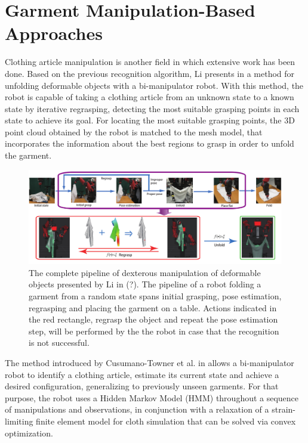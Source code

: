 \section{Garment Manipulation-Based Approaches}
\label{sota:garment_manipulation_based}
Clothing article manipulation is another field in which extensive work has been done. Based on the previous recognition algorithm, Li presents in \cite{Li2015ICRA} a method for unfolding deformable objects with a bi-manipulator robot. With this method, the robot is capable of taking a clothing article from an unknown state to a known state by iterative regrasping, detecting the most suitable grasping points in each state to achieve its goal. For locating the most suitable grasping points, the 3D point cloud obtained by the robot is matched to the mesh model, that incorporates the information about the best regions to grasp in order to unfold the garment.

\begin{figure}[thpb]
    \centering
    \includegraphics[width=\textwidth]{figures/SOTA_Li_2015.png}
    \caption{The complete pipeline of dexterous manipulation of deformable objects presented by Li in  (?). The pipeline of a robot folding a garment from a random state spans initial grasping, pose estimation, regrasping and placing the garment on a table. Actions indicated in the red rectangle, regrasp the object and repeat the pose estimation step, will be performed by the the robot in case that the recognition is not successful.}
    \label{fig:SOTA_Li_2015}
\end{figure}

The method introduced by Cusumano-Towner et al. in \cite{Cusumano-Towner2011} allows a bi-manipulator robot to identify a clothing article, estimate its current state and achieve a desired configuration, generalizing to previously unseen garments. For that purpose, the robot uses a Hidden Markov Model (HMM) throughout a sequence of manipulations and observations, in conjunction with a relaxation of a strain-limiting finite element model for cloth simulation that can be solved via convex optimization.

